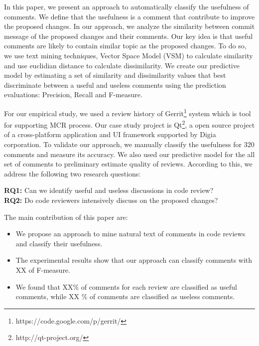 \documentclass[conference]{IEEEtran}
\begin{document}
In this paper, we present an approach to automatically classify the usefulness of comments. We define that the usefulness is a comment that contribute to improve the proposed changes. In our approach, we analyze the similarity between commit message of the proposed changes and their comments. Our key idea is that useful comments are likely to contain similar topic as the proposed changes. To do so, we use text mining techniques, Vector Space Model (VSM) to calculate similarity and use euclidian distance to calculate dissimilarity. 
We create our predictive model by estimating a set of similarity and dissimilarity values that best discriminate between a useful and useless comments using the prediction evaluations: Precision, Recall and F-measure.

For our empirical study, we used a review history of Gerrit\footnote{https://code.google.com/p/gerrit/} system which is tool for supporting MCR process. Our case study project is Qt\footnote{http://qt-project.org/}, a open source project of a cross-platform application and UI framework supported by Digia corporation. To validate our approach, we manually classify the usefulness for 320 comments and measure its accuracy. We also used our predictive model for the all set of comments to preliminary estimate quality of reviews. According to this, we address the following two research questions:

\noindent \textbf{RQ1:} Can we identify useful and useless discussions in code review?\\
\noindent \textbf{RQ2:} Do code reviewers intensively discuss on the proposed changes?

\noindent The main contribution of this paper are:
\begin{itemize}
\item We propose an approach to mine natural text of comments in code reviews and classify their usefulness.
\item The experimental results show that our approach can classify comments with XX of F-measure.
\item We found that XX\% of comments for each review are classified as useful comments, while XX \% of comments are classified as useless comments.
\end{itemize} 



\end{document}
